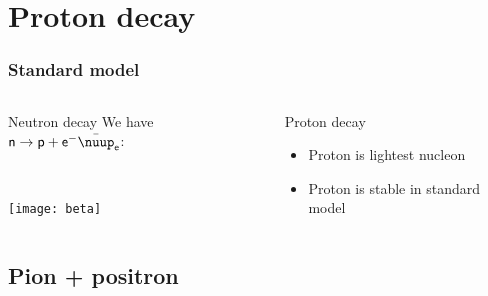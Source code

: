 \documentclass[english, fleqn]{beamer}
\begin{document}
\section{Proton decay}

\begin{frame}
    \frametitle{Standard model}

    \begin{columns}[t]
        \begin{column}{.5\linewidth}
            \begin{block}{Neutron decay}
                We have $\mathsf n \to \mathsf p + \mathsf e^- \bar\nuup_{\mathsf e}$:

                \

                \texttt{[image: beta]}
            \end{block}
        \end{column}
        \pause
        \begin{column}{.5\linewidth}
            \begin{block}{Proton decay}
                \begin{itemize}
                    \item Proton is lightest nucleon
                    \item \alert{Proton is stable in standard model}
                \end{itemize}
            \end{block}
        \end{column}
    \end{columns}
\end{frame}

\subsection{Pion + positron}
\end{document}
